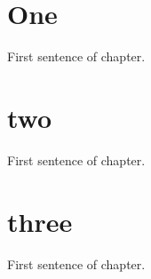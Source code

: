 \documentclass{book}
\begin{document}
\chapter{One}
\titlespacing*{\chapter}{0pt}{50pt}{40pt}
First sentence of chapter.

\chapter{two}
First sentence of chapter.

\chapter{three}
First sentence of chapter.
\end{document}
